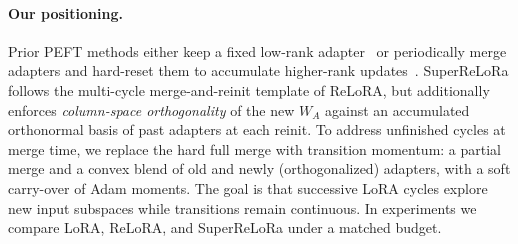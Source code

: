 \paragraph{Our positioning.}
Prior PEFT methods either keep a fixed low-rank adapter~\cite{hu2021lora,zhang2023,liu2024dora,kopiczko2024vera,dettmers2023} or periodically merge adapters and hard-reset them to accumulate higher-rank updates~\cite{lialin2023stack}.
SuperReLoRa follows the multi-cycle merge-and-reinit template of ReLoRA, but additionally enforces \emph{column-space orthogonality} of the new $W_A$ against an accumulated orthonormal basis of past adapters at each reinit.
To address unfinished cycles at merge time, we replace the hard full merge with transition momentum: a partial merge and a convex blend of old and newly (orthogonalized) adapters, with a soft carry-over of Adam moments.
The goal is that successive LoRA cycles explore new input subspaces while transitions remain continuous.
In experiments we compare LoRA, ReLoRA, and SuperReLoRa under a matched budget.
